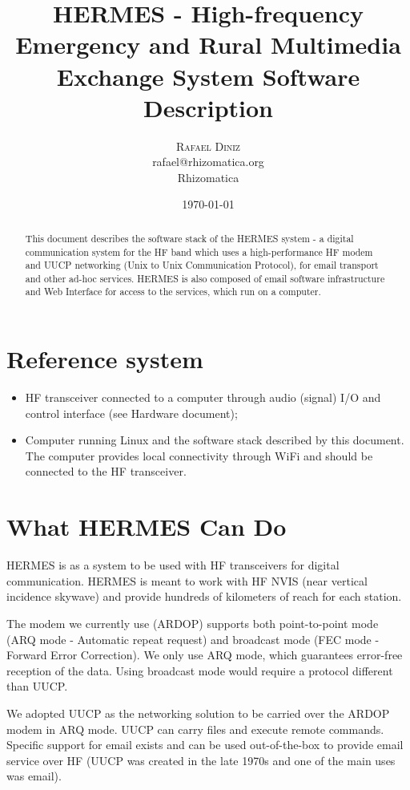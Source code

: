 \documentclass[11pt,a4paper]{article}
\title{HERMES - High-frequency Emergency and Rural Multimedia Exchange
  System Software Description}
\author{
       \large
        \textsc{Rafael Diniz}
        \mbox{}\\ %
        rafael@rhizomatica.org\\
        \mbox{Rhizomatica} \\ %
}
\date{\today}
\begin{document}
\maketitle

\begin{abstract}

This document describes the software stack of the HERMES
system - a digital communication system for the HF band which uses a
high-performance HF modem and UUCP networking (Unix to Unix
Communication Protocol), for email transport and other ad-hoc
services. HERMES is also composed of email software infrastructure and
Web Interface for access to the services, which run on a computer.

\end{abstract}

\newpage

\tableofcontents

\section{Reference system}

\begin{itemize}
\item HF transceiver connected to a computer through audio (signal) I/O and
  control interface (see Hardware document);
\item Computer running Linux and the software stack described by this
  document. The computer provides local connectivity through WiFi and should
  be connected to the HF transceiver.
\end{itemize}

\section{What HERMES Can Do}

HERMES is as a system to be used with HF transceivers for digital
communication. HERMES is meant to work with HF NVIS (near vertical incidence
skywave) and provide hundreds of kilometers of reach for each station.

The modem we currently use (ARDOP) supports both point-to-point mode (ARQ
mode - Automatic repeat request) and broadcast mode (FEC mode - Forward
Error Correction). We only use ARQ mode, which guarantees error-free
reception of the data. Using broadcast mode would require a protocol
different than UUCP.

We adopted UUCP as the networking solution to be carried over the ARDOP modem in
ARQ mode. UUCP can carry files and execute remote commands. Specific support
for email exists and can be used out-of-the-box to provide email service over
HF (UUCP was created in the late 1970s and one of the main uses was email).
\end{document}
